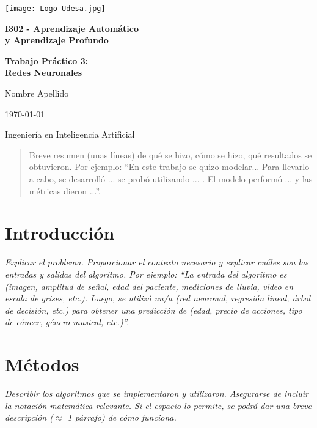\documentclass[11pt]{article}
\begin{document}
\begin{titlepage}
    \centering
    \vspace*{2cm}
    \texttt{[image: Logo-Udesa.jpg]}\par
    \vspace{10pt}

    {\LARGE \textbf{I302 - Aprendizaje Automático\\ y Aprendizaje Profundo}\par}
    \vspace{1cm}

    {\LARGE \textbf{Trabajo Práctico 3: \\Redes Neuronales}\par}
    \vspace{4cm}
    
    {\LARGE {Nombre  Apellido}\par}  %
    \vspace{4cm}
    
    {\Large \today\par}
    \vspace{1cm}
    \Large{Ingeniería en Inteligencia Artificial}
\end{titlepage}

\begin{abstract}
Breve resumen (unas líneas) de qué se hizo, cómo se hizo, qué resultados se obtuvieron. Por ejemplo: ``En este trabajo se quizo modelar... Para llevarlo a cabo, se desarrolló ... se probó utilizando ... . El modelo performó ... y las métricas dieron ...''.
\end{abstract}

\section{Introducción}
\textit{Explicar el problema. Proporcionar el contexto necesario y explicar cuáles son las entradas y salidas del algoritmo. Por ejemplo: “La entrada del algoritmo es (imagen, amplitud de señal, edad del paciente, mediciones de lluvia, video en escala de grises, etc.). Luego, se utilizó un/a (red neuronal, regresión lineal, árbol de decisión, etc.) para obtener una predicción de (edad, precio de acciones, tipo de cáncer, género musical, etc.)”.}

\section{Métodos}
\textit{Describir los algoritmos que se implementaron y utilizaron. Asegurarse de incluir la notación matemática relevante. Si el espacio lo permite, se podrá dar una breve descripción ($\approx$ 1 párrafo) de cómo funciona.}
\end{document}
